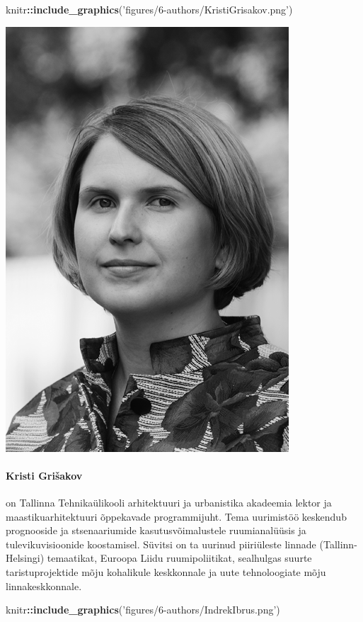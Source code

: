 \documentclass[estonian,]{article}
\newenvironment{Shaded}{\begin{snugshade}}{\end{snugshade}}
\newcommand{\KeywordTok}[1]{\textcolor[rgb]{0.13,0.29,0.53}{\textbf{#1}}}
\newcommand{\NormalTok}[1]{#1}
\newcommand{\OperatorTok}[1]{\textcolor[rgb]{0.81,0.36,0.00}{\textbf{#1}}}
\newcommand{\StringTok}[1]{\textcolor[rgb]{0.31,0.60,0.02}{#1}}
\let\oldparagraph\paragraph
\renewcommand{\paragraph}[1]{\oldparagraph{#1}\mbox{}}
\begin{document}
\begin{Shaded}
\begin{Highlighting}[]
\NormalTok{knitr}\OperatorTok{::}\KeywordTok{include_graphics}\NormalTok{(}\StringTok{'figures/6-authors/KristiGrisakov.png'}\NormalTok{)}
\end{Highlighting}
\end{Shaded}

\begin{flushleft}\includegraphics[width=0.5\linewidth]{figures/6-authors/KristiGrisakov} \end{flushleft}

\hypertarget{kristi-griux161akov}{%
\paragraph{Kristi Grišakov}\label{kristi-griux161akov}}

on Tallinna Tehnikaülikooli arhitektuuri ja urbanistika akadeemia lektor ja maastikuarhitektuuri õppekavade programmijuht. Tema uurimistöö keskendub prognooside ja stsenaariumide kasutusvõimalustele ruumianalüüsis ja tulevikuvisioonide koostamisel. Süvitsi on ta uurinud piiriüleste linnade (Tallinn-Helsingi) temaatikat, Euroopa Liidu ruumipoliitikat, sealhulgas suurte taristuprojektide mõju kohalikule keskkonnale ja uute tehnoloogiate mõju linnakeskkonnale.

\begin{Shaded}
\begin{Highlighting}[]
\NormalTok{knitr}\OperatorTok{::}\KeywordTok{include_graphics}\NormalTok{(}\StringTok{'figures/6-authors/IndrekIbrus.png'}\NormalTok{)}
\end{Highlighting}
\end{Shaded}
\end{document}
